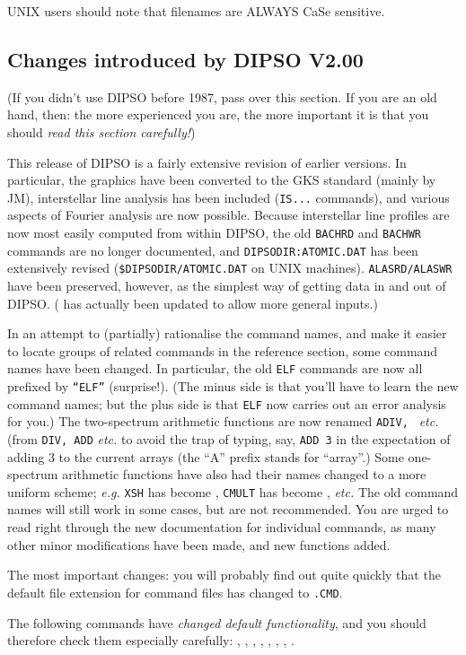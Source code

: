 UNIX users should note that filenames are ALWAYS CaSe sensitive.

\subsection{ Changes introduced by DIPSO V2.00}

(If you didn't use DIPSO before 1987, pass over this section. If you
are an old hand, then: the more experienced you are, the more
important it is that you should {\em read this section carefully!})

This release of DIPSO is a fairly extensive revision of earlier
versions. In particular, the graphics have been converted to the GKS
standard (mainly by JM), interstellar line analysis has been included
({\tt{IS...}}  commands), and various aspects of Fourier analysis are
now possible. Because interstellar line profiles are now most easily
computed from within DIPSO, the old {\tt{BACHRD}}  and {\tt{BACHWR}} 
commands are no longer documented, and {\tt{DIPSODIR:ATOMIC.DAT}}  has
been extensively revised ({\tt{\$DIPSODIR/ATOMIC.DAT}}  on UNIX
machines). {\tt{ALASRD/ALASWR}}  have been preserved, however, as the
simplest way of getting data in and out of DIPSO. (  has
actually been updated to allow more general inputs.)

In an attempt to (partially) rationalise the command names, and make it
easier to locate groups of related commands in the reference section,
some command names have been changed. In particular, the old {\tt{ELF}} 
commands are now all prefixed by {\tt{``ELF''}}  (surprise!). (The minus
side is that you'll have to learn the new command names; but the plus
side is that {\tt{ELF}}  now carries out an error analysis for you.) The
two-spectrum arithmetic functions are now renamed {\tt{ADIV,}  }  {\em
etc.} (from {\tt{DIV,}  ADD} {\em etc.} to avoid the trap of typing, say,
{\tt{ADD~3}}  in the expectation of adding 3 to the current arrays (the
``A'' prefix stands for ``array''.) Some one-spectrum arithmetic
functions have also had their names changed to a more uniform scheme;
{\em e.g.} {\tt{XSH}}  has become ,  {\tt{CMULT}}  has become
,  {\em etc.} The old command names will still work in some cases,
but are not recommended. You are urged to read right through the new
documentation for individual commands, as many other minor modifications
have been made, and new functions added.

The most important changes: you will probably find out quite quickly
that the default file extension for command files has changed to
{\tt{.CMD}}. 

The following commands have {\em changed default functionality}, and
you should therefore check them especially carefully: , 
,    ,  ,  , 
,  ,  . 



